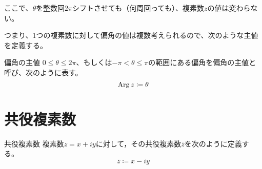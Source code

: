 \documentclass[../math-imaging]{subfiles}
\begin{document}
ここで、$\theta$を整数回$2\pi$シフトさせても（何周回っても）、複素数$z$の値は変わらない。

つまり、1つの複素数に対して偏角の値は複数考えられるので、次のような主値を定義する。

\begin{definition}{偏角の主値}
  \newline
  $0\leq \theta \leq 2\pi$、もしくは$-\pi < \theta \leq \pi$の範囲にある偏角を偏角の主値と呼び、次のように表す。
  \LARGE
  \begin{equation}
    \operatorname{Arg} z \coloneqq \theta
  \end{equation}
\end{definition}

\section{共役複素数}

\begin{definition}{共役複素数}
  \newline
  複素数$z=x+iy$に対して，その共役複素数$\overline{z}$を次のように定義する。
  \LARGE
  \begin{equation}
    \overline{z}\coloneqq x-iy
  \end{equation}
\end{definition}
\end{document}
